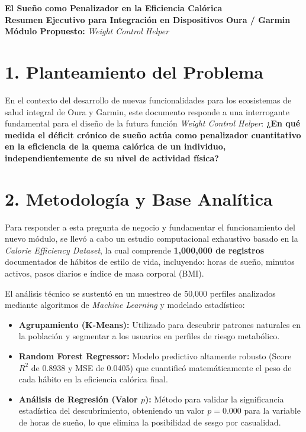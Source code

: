 \documentclass{article}
\begin{document}
\begin{center}
    \vspace*{0.5cm}
    {\huge \textbf{El Sueño como Penalizador en la Eficiencia Calórica}}\\[0.5cm]
    {\Large \textbf{Resumen Ejecutivo para Integración en Dispositivos Oura / Garmin}}\\[0.3cm]
    {\large \textbf{Módulo Propuesto:} \textit{Weight Control Helper}}\\[0.8cm]
\end{center}

\section*{1. Planteamiento del Problema}
En el contexto del desarrollo de nuevas funcionalidades para los ecosistemas de salud integral de Oura y Garmin, este documento responde a una interrogante fundamental para el diseño de la futura función \textit{Weight Control Helper}: \textbf{¿En qué medida el déficit crónico de sueño actúa como penalizador cuantitativo en la eficiencia de la quema calórica de un individuo, independientemente de su nivel de actividad física?}

\section*{2. Metodología y Base Analítica}
Para responder a esta pregunta de negocio y fundamentar el funcionamiento del nuevo módulo, se llevó a cabo un estudio computacional exhaustivo basado en la \textit{Calorie Efficiency Dataset}, la cual comprende \textbf{1,000,000 de registros} documentados de hábitos de estilo de vida, incluyendo: horas de sueño, minutos activos, pasos diarios e índice de masa corporal (BMI).

El análisis técnico se sustentó en un muestreo de 50,000 perfiles analizados mediante algoritmos de \textit{Machine Learning} y modelado estadístico:
\begin{itemize}[leftmargin=*, itemsep=2pt]
    \item \textbf{Agrupamiento (K-Means):} Utilizado para descubrir patrones naturales en la población y segmentar a los usuarios en perfiles de riesgo metabólico.
    \item \textbf{Random Forest Regressor:} Modelo predictivo altamente robusto (Score $R^2$ de 0.8938 y MSE de 0.0405) que cuantificó matemáticamente el peso de cada hábito en la eficiencia calórica final.
    \item \textbf{Análisis de Regresión (Valor $p$):} Método para validar la significancia estadística del descubrimiento, obteniendo un valor $p = 0.000$ para la variable de horas de sueño, lo que elimina la posibilidad de sesgo por casualidad.
\end{itemize}
\end{document}

